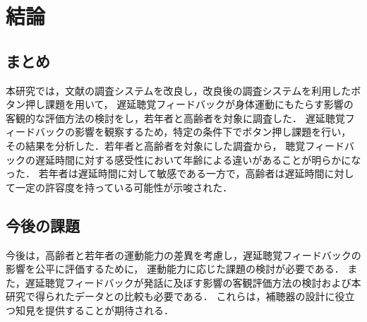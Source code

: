 \section{結論}
\subsection{まとめ}
本研究では，文献\cite{cf:shigematu}の調査システムを改良し，改良後の調査システムを利用したボタン押し課題を用いて，
遅延聴覚フィードバックが身体運動にもたらす影響の客観的な評価方法の検討をし，若年者と高齢者を対象に調査した．
遅延聴覚フィードバックの影響を観察するため，特定の条件下でボタン押し課題を行い，
その結果を分析した．若年者と高齢者を対象にした調査から，
聴覚フィードバックの遅延時間に対する感受性において年齢による違いがあることが明らかになった．
若年者は遅延時間に対して敏感である一方で，高齢者は遅延時間に対して一定の許容度を持っている可能性が示唆された．
\subsection{今後の課題}
今後は，高齢者と若年者の運動能力の差異を考慮し，遅延聴覚フィードバックの影響を公平に評価するために，
運動能力に応じた課題の検討が必要である．
また，遅延聴覚フィードバックが発話に及ぼす影響の客観評価方法の検討および本研究で得られたデータとの比較も必要である．
これらは，補聴器の設計に役立つ知見を提供することが期待される．